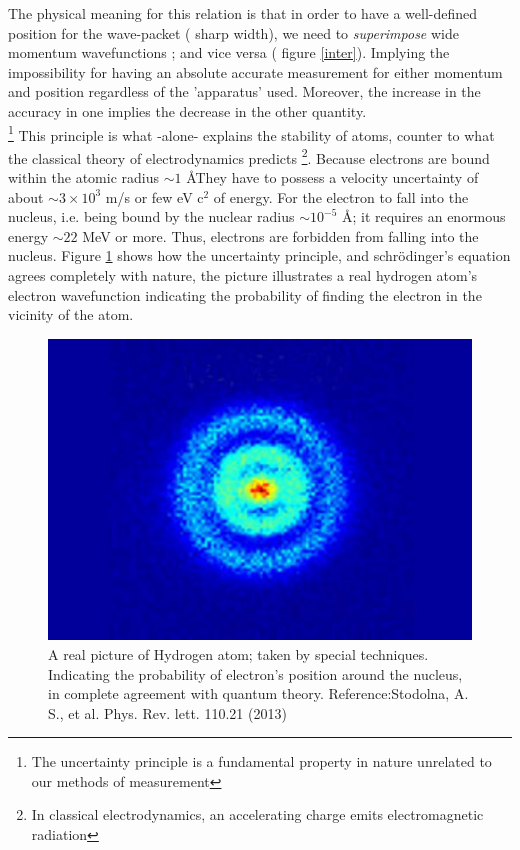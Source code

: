   The physical meaning for this relation is that in order to have a well-defined position for the wave-packet ( sharp width), we need to \textit{superimpose}  wide momentum wavefunctions ; and vice versa ( figure \ref{inter}). Implying the impossibility for having an absolute accurate measurement for either momentum and position regardless of the 'apparatus' used. Moreover, the increase in the accuracy in one implies the decrease in the other quantity.\\ \footnote{ The uncertainty principle is a fundamental property in nature unrelated to our methods of measurement}
  This principle is what -alone- explains the stability of atoms, counter to what the classical theory of electrodynamics predicts \footnote{In classical electrodynamics, an accelerating charge emits electromagnetic radiation}. Because electrons are bound within the atomic radius $ \sim 1$ \AA  They have to possess a velocity uncertainty of  about $ \sim 3 \times 10^3$ m/s or few eV c$ ^2$  of energy. For the electron to fall into the nucleus, i.e. being bound by the nuclear radius  $ \sim 10^{-5}$ \AA; it requires an enormous energy $ \sim 22$ MeV or more. Thus, electrons are forbidden from falling into the nucleus. Figure \ref{h} shows how the uncertainty principle, and schr\"{o}dinger's equation agrees completely with nature, the picture illustrates a real hydrogen atom's electron wavefunction indicating the probability of finding the electron in the vicinity of the atom.
  \begin{figure} 
  	\centering 
  	\includegraphics[scale = 0.2] {./figures/hatom.jpg}
  	\caption{ A real picture of Hydrogen atom; taken by special techniques. Indicating the probability of electron's position around the nucleus, in complete agreement with quantum theory. Reference:Stodolna, A. S., et al. Phys. Rev. lett. 110.21 (2013)}
  	\label{h}
  \end{figure}
